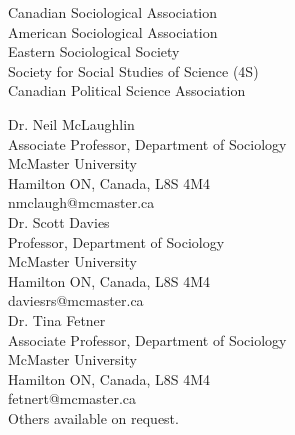 \documentclass[11pt,usenames,dvipsnames]{article}
\begin{document}


\noindent Canadian Sociological Association\\
\noindent American Sociological Association \\
\noindent Eastern Sociological Society\\
\noindent Society for Social Studies of Science (4S)\\
\noindent Canadian Political Science Association \\



\noindent Dr. Neil McLaughlin\\
Associate Professor, Department of Sociology\\
McMaster University\\
Hamilton ON, Canada, L8S 4M4\\
nmclaugh@mcmaster.ca\\

\noindent Dr. Scott Davies\\
Professor, Department of Sociology\\
McMaster University\\
Hamilton ON, Canada, L8S 4M4\\
daviesrs@mcmaster.ca\\

\noindent Dr. Tina Fetner\\
Associate Professor, Department of Sociology\\
McMaster University\\
Hamilton ON, Canada, L8S 4M4\\
fetnert@mcmaster.ca\\

\noindent Others available on request.\\
\end{document}
